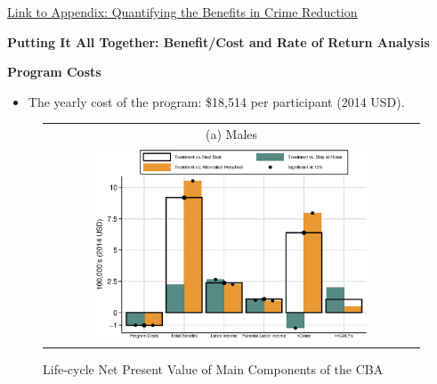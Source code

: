\documentclass[static]{JJH-Beamer}
\begin{document}
\begin{frame}

\hypertarget{ret:muffin}{}
\begin{center}
\hyperlink{muffin}{\underline{Link to Appendix: Quantifying the Benefits in Crime Reduction}}
\end{center}

\end{frame}

\begin{frame}

\begin{block}{}
\begin{center}
\textbf{Putting It All Together: Benefit/Cost and Rate of Return Analysis}
\end{center}
\end{block}

\end{frame}

\begin{frame}

\begin{center}
\textbf{Program Costs}
\end{center}

\begin{itemize}
\item The yearly cost of the program: \$18,514 per participant (2014 USD).
\end{itemize}

\end{frame}
\begin{frame}

\begin{figure}[H]
\caption{Life-cycle Net Present Value of Main Components of the CBA}\label{fig:npvsgender}
\begin{center}
\begin{tabular}{c}
(a) Males\\
\includegraphics[width=0.75\textwidth]{output/abccare_npvs2.eps}
\end{tabular}
\end{center}
\end{figure}

\end{frame}
\end{document}
